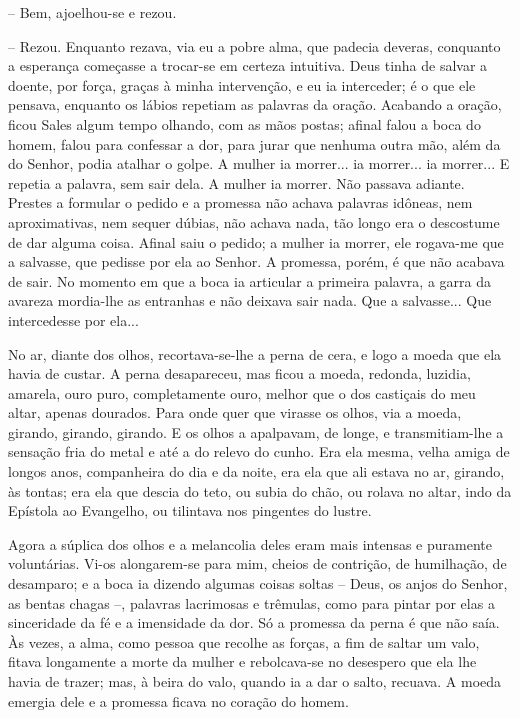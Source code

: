 -- Bem, ajoelhou-se e rezou.

-- Rezou. Enquanto rezava, via eu a pobre alma, que padecia deveras,
conquanto a esperança começasse a trocar-se em certeza intuitiva. Deus
tinha de salvar a doente, por força, graças à minha intervenção, e eu ia
interceder; é o que ele pensava, enquanto os lábios repetiam as palavras
da oração. Acabando a oração, ficou Sales algum tempo olhando, com as
mãos postas; afinal falou a boca do homem, falou para confessar a dor,
para jurar que nenhuma outra mão, além da do Senhor, podia atalhar o
golpe. A mulher ia morrer... ia morrer... ia morrer... E repetia a
palavra, sem sair dela. A mulher ia morrer. Não passava adiante. Prestes
a formular o pedido e a promessa não achava palavras idôneas, nem
aproximativas, nem sequer dúbias, não achava nada, tão longo era o
descostume de dar alguma coisa. Afinal saiu o pedido; a mulher ia
morrer, ele rogava-me que a salvasse, que pedisse por ela ao Senhor. A
promessa, porém, é que não acabava de sair. No momento em que a boca ia
articular a primeira palavra, a garra da avareza mordia-lhe as entranhas
e não deixava sair nada. Que a salvasse... Que intercedesse por ela...

No ar, diante dos olhos, recortava-se-lhe a perna de cera, e logo a
moeda que ela havia de custar. A perna desapareceu, mas ficou a moeda,
redonda, luzidia, amarela, ouro puro, completamente ouro, melhor que o
dos castiçais do meu altar, apenas dourados. Para onde quer que virasse
os olhos, via a moeda, girando, girando, girando. E os olhos a
apalpavam, de longe, e transmitiam-lhe a sensação fria do metal e até a
do relevo do cunho. Era ela mesma, velha amiga de longos anos,
companheira do dia e da noite, era ela que ali estava no ar, girando, às
tontas; era ela que descia do teto, ou subia do chão, ou rolava no
altar, indo da Epístola ao Evangelho, ou tilintava nos pingentes do
lustre.

Agora a súplica dos olhos e a melancolia deles eram mais intensas e
puramente voluntárias. Vi-os alongarem-se para mim, cheios de contrição,
de humilhação, de desamparo; e a boca ia dizendo algumas coisas soltas
-- Deus, os anjos do Senhor, as bentas chagas --, palavras lacrimosas e
trêmulas, como para pintar por elas a sinceridade da fé e a imensidade
da dor. Só a promessa da perna é que não saía. Às vezes, a alma, como
pessoa que recolhe as forças, a fim de saltar um valo, fitava longamente
a morte da mulher e rebolcava-se no desespero que ela lhe havia de
trazer; mas, à beira do valo, quando ia a dar o salto, recuava. A moeda
emergia dele e a promessa ficava no coração do homem.

